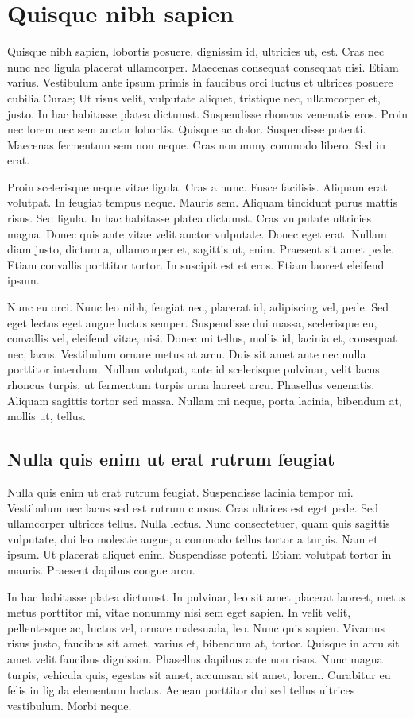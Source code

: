 \documentclass[printmode]{mgr}
\begin{document}
\chapter{Quisque nibh sapien}
Quisque nibh sapien, lobortis posuere, dignissim id, ultricies ut,
est. Cras nec nunc nec ligula placerat ullamcorper. Maecenas consequat
consequat nisi. Etiam varius. Vestibulum ante ipsum primis in faucibus
orci luctus et ultrices posuere cubilia Curae; Ut risus velit,
vulputate aliquet, tristique nec, ullamcorper et, justo. In hac
habitasse platea dictumst. Suspendisse rhoncus venenatis eros. Proin
nec lorem nec sem auctor lobortis. Quisque ac dolor. Suspendisse
potenti. Maecenas fermentum sem non neque. Cras nonummy commodo
libero. Sed in erat.

Proin scelerisque neque vitae ligula. Cras a nunc. Fusce
facilisis. Aliquam erat volutpat. In feugiat tempus neque. Mauris
sem. Aliquam tincidunt purus mattis risus. Sed ligula. In hac
habitasse platea dictumst. Cras vulputate ultricies magna. Donec quis
ante vitae velit auctor vulputate. Donec eget erat. Nullam diam justo,
dictum a, ullamcorper et, sagittis ut, enim. Praesent sit amet
pede. Etiam convallis porttitor tortor. In suscipit est et eros. Etiam
laoreet eleifend ipsum.

Nunc eu orci. Nunc leo nibh, feugiat nec, placerat id, adipiscing vel,
pede. Sed eget lectus eget augue luctus semper. Suspendisse dui massa,
scelerisque eu, convallis vel, eleifend vitae, nisi. Donec mi tellus,
mollis id, lacinia et, consequat nec, lacus. Vestibulum ornare metus
at arcu. Duis sit amet ante nec nulla porttitor interdum. Nullam
volutpat, ante id scelerisque pulvinar, velit lacus rhoncus turpis, ut
fermentum turpis urna laoreet arcu. Phasellus venenatis. Aliquam
sagittis tortor sed massa. Nullam mi neque, porta lacinia, bibendum
at, mollis ut, tellus.

\section{Nulla quis enim ut erat rutrum feugiat}
Nulla quis enim ut erat rutrum feugiat. Suspendisse lacinia tempor
mi. Vestibulum nec lacus sed est rutrum cursus. Cras ultrices est eget
pede. Sed ullamcorper ultrices tellus. Nulla lectus. Nunc
consectetuer, quam quis sagittis vulputate, dui leo molestie augue, a
commodo tellus tortor a turpis. Nam et ipsum. Ut placerat aliquet
enim. Suspendisse potenti. Etiam volutpat tortor in mauris. Praesent
dapibus congue arcu.

In hac habitasse platea dictumst. In pulvinar, leo sit amet placerat
laoreet, metus metus porttitor mi, vitae nonummy nisi sem eget
sapien. In velit velit, pellentesque ac, luctus vel, ornare malesuada,
leo. Nunc quis sapien. Vivamus risus justo, faucibus sit amet, varius
et, bibendum at, tortor. Quisque in arcu sit amet velit faucibus
dignissim. Phasellus dapibus ante non risus. Nunc magna turpis,
vehicula quis, egestas sit amet, accumsan sit amet, lorem. Curabitur
eu felis in ligula elementum luctus. Aenean porttitor dui sed tellus
ultrices vestibulum. Morbi neque.
\end{document}
